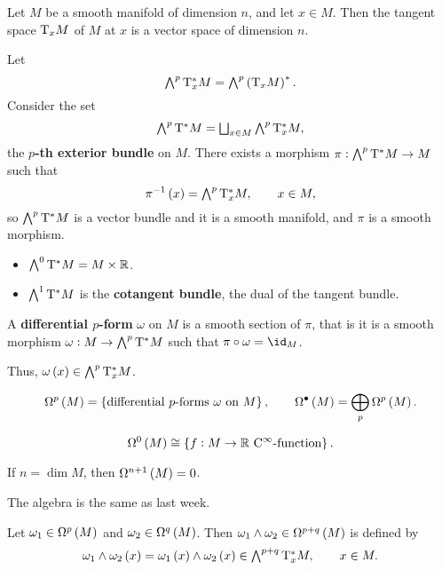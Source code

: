 Let $ M $ be a smooth manifold of dimension $ n $, and let $ x \in M $. Then the tangent space $ \mathrm{T}_xM $ of $ M $ at $ x $ is a vector space of dimension $ n $.

\begin{notation}
Let
$$ \ext^p\T_x^*M = \ext^p\br{\T_xM}^*. $$
Consider the set
$$ \textstyle\bigwedge^p\mathrm{T}^*M = \bigsqcup_{x \in M} \textstyle\bigwedge^p\mathrm{T}_x^*M, $$
the \textbf{$ p $-th exterior bundle} on $ M $. There exists a morphism $ \pi : \textstyle\bigwedge^p\mathrm{T}^*M \to M $ such that
$$ \pi^{-1}\br{x} = \ext^p\T_x^*M, \qquad x \in M, $$
so $ \textstyle\bigwedge^p\mathrm{T}^*M $ is a vector bundle and it is a smooth manifold, and $ \pi $ is a smooth morphism.
\end{notation}

\begin{example}
\hfill
\begin{itemize}
\item $ \textstyle\bigwedge^0\mathrm{T}^*M = M \times \mathbb{R} $.
\item $ \textstyle\bigwedge^1\mathrm{T}^*M $ is the \textbf{cotangent bundle}, the dual of the tangent bundle.
\end{itemize}
\end{example}


\begin{definition}
A \textbf{differential $ p $-form} $ \omega $ on $ M $ is a smooth section of $ \pi $, that is it is a smooth morphism $ \omega : M \to \textstyle\bigwedge^p\mathrm{T}^*M $ such that $ \pi \circ \omega = \id_M $.
\end{definition}

Thus, $ \omega\br{x} \in \ext^p\T_x^*M $.

\begin{notation}
$$ \Omega^p\br{M} = \cbr{\text{differential $ p $-forms} \ \omega \ \text{on} \ M}, \qquad \Omega^\bullet\br{M} = \bigoplus_p \Omega^p\br{M}. $$
\end{notation}

\begin{example}
$$ \Omega^0\br{M} \cong \cbr{f : M \to \RR \ \text{$ \C^\infty $-function}}. $$
\end{example}

\begin{exercise*}
If $ n = \dim M $, then $ \Omega^{n + 1}\br{M} = 0 $.
\end{exercise*}

The algebra is the same as last week.

\begin{definition}
Let $ \omega_1 \in \Omega^p\br{M} $ and $ \omega_2 \in \Omega^q\br{M} $. Then $ \omega_1 \wedge \omega_2 \in \Omega^{p + q}\br{M} $ is defined by
$$ \omega_1 \wedge \omega_2\br{x} = \omega_1\br{x} \wedge \omega_2\br{x} \in \ext^{p + q}\T_x^*M, \qquad x \in M. $$
\end{definition}


